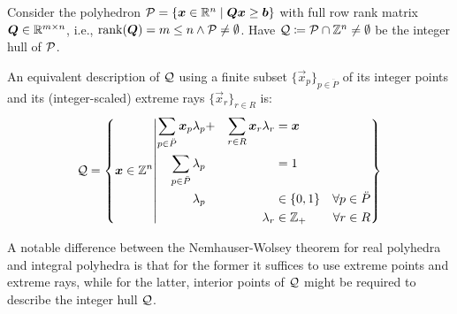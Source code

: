 \begin{theorem}\label{th:nemhauser-wolsey-integer}
Consider the polyhedron $\mathcal{P} = \{{\bm{x}} \in \mathbb{R}^n \mid {\bm{Q}} {\bm{x}} \geq {\bm{b}}\}$ with full row rank matrix ${\bm{Q}} \in \mathbb{R}^{m \times n}$, i.e., $\operatorname{rank}({\bm{Q}}) = m \leq n \land \mathcal{P} \neq \emptyset$. Have $\mathcal{Q} \coloneqq \mathcal{P} \cap \mathbb{Z}^n \neq \emptyset$ be the integer hull of $\mathcal{P}$.

An equivalent description of $\mathcal{Q}$ using a finite subset $\{\vec{x}_p\}_{p \in \ddot{P}}$ of its integer points and its (integer-scaled) extreme rays $\{\vec{x}_r\}_{r \in R}$ is:
\begin{equation}
\mathcal{Q} = \left\{ {\bm{x}} \in \mathbb{Z}^n \middle\vert
\begin{aligned}
\sum_{p \in \ddot{P}} {\bm{x}}_p \lambda_p &+ &\sum_{r \in R} {\bm{x}}_r \lambda_r &= {\bm{x}} &\\
\sum_{p \in \ddot{P}} \lambda_p & & &= 1 &\\
\lambda_p & & &\in \{0, 1\} &\forall p \in \ddot{P}\\
& &\lambda_r &\in \mathbb{Z}_+ &\forall r \in R
\end{aligned}
\right\}
\end{equation}
\end{theorem}

\begin{note}\label{note:nemhauser-wolsey}
A notable difference between the Nemhauser-Wolsey theorem for real polyhedra and integral polyhedra is that for the former it suffices to use extreme points and extreme rays, while for the latter, interior points of $\mathcal{Q}$ might be required to describe the integer hull $\mathcal{Q}$.
\end{note}
